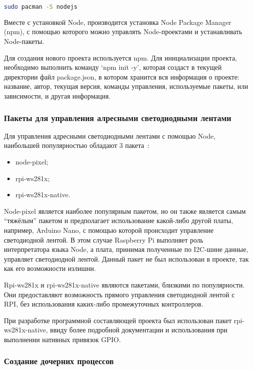 \begin{lstlisting}[style=ES6, language=bash]
  sudo pacman -S nodejs
\end{lstlisting}

Вместе с установкой Node, производится установка Node Package Manager (npm), с помощью которого можно управлять Node-проектами и устанавливать Node-пакеты.

Для создания нового проекта используется npm. Для инициализации проекта, необходимо выполнить команду `npm init -y', которая создаст в текущей директории файл package.json, в котором хранится вся информация о проекте: название, автор, текущая версия, команды управления, используемые пакеты, или зависимости, и другая информация.

\subsubsection{Пакеты для управления алресными светодиодными лентами}

Для управления адресными светодиодными лентами с помощью Node, наибольшей популярностью обладают 3 пакета~\cite{npm}:

\begin{itemize}
  \item node-pixel;
  \item rpi-ws281x;
  \item rpi-ws281x-native.
\end{itemize}

Node-pixel является наиболее популярным пакетом, но он также является самым ``тяжёлым'' пакетом и предполагает использование какой-либо другой платы, например, Arduino Nano, с помощью которой происходит управление светодиодной лентой. В этом случае Raspberry Pi выполняет роль интерпретатора языка Node, а плата, принимая полученные по I2C-шине данные, управляет светодиодной лентой. Данный пакет не был использован в проекте, так как его возможности излишни.

Rpi-ws281x и rpi-ws281x-native являются пакетами, близкими по популярности. Они предоставляют возможность прямого управления светодиодной лентой с RPI, без использования каких-либо промежуточных контроллеров.

При разработке программной составляющей проекта был использован пакет rpi-ws281x-native, ввиду более подробной документации и использования при выполнении нативных привязок GPIO.

\subsubsection{Создание дочерних процессов}

